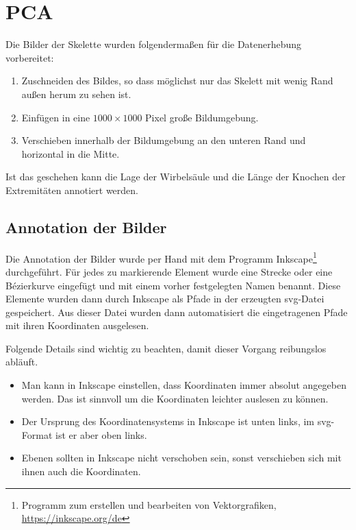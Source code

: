 \section{PCA}
\label{implementation_detail_pca}

Die Bilder der Skelette wurden folgendermaßen für die Datenerhebung vorbereitet:
 
 \begin{enumerate}
  \item Zuschneiden des Bildes, so dass möglichst nur das Skelett mit wenig Rand außen herum zu sehen ist.
  \item Einfügen in eine $1000 \times 1000$ Pixel große Bildumgebung.
  \item Verschieben innerhalb der Bildumgebung an den unteren Rand und horizontal in die Mitte.
 \end{enumerate}

 Ist das geschehen kann die Lage der Wirbelsäule und die Länge der Knochen der Extremitäten annotiert werden.
 
\subsection{Annotation der Bilder}

Die Annotation der Bilder wurde per Hand mit dem Programm Inkscape\footnote{Programm zum erstellen und bearbeiten von Vektorgrafiken, \url{https://inkscape.org/de}} durchgeführt. Für jedes zu markierende Element wurde eine Strecke oder eine Bézierkurve eingefügt und mit einem vorher festgelegten Namen benannt. Diese Elemente wurden dann durch Inkscape als Pfade in der erzeugten svg-Datei gespeichert. Aus dieser Datei wurden dann automatisiert die eingetragenen Pfade mit ihren Koordinaten ausgelesen.

Folgende Details sind wichtig zu beachten, damit dieser Vorgang reibungslos abläuft. 
\begin{itemize}
 \item Man kann in Inkscape einstellen, dass Koordinaten immer absolut angegeben werden. Das ist sinnvoll um die Koordinaten leichter auslesen zu können.
 \item Der Ursprung des Koordinatensystems in Inkscape ist unten links, im svg-Format ist er aber oben links.
 \item Ebenen sollten in Inkscape nicht verschoben sein, sonst verschieben sich mit ihnen auch die Koordinaten.  
\end{itemize}

